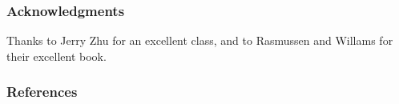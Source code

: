 \documentclass{article} %
\begin{document}
\subsubsection*{Acknowledgments}
Thanks to Jerry Zhu for an excellent class, and to Rasmussen and Willams for their excellent book.

\subsubsection*{References}
\small{
}
\end{document}
